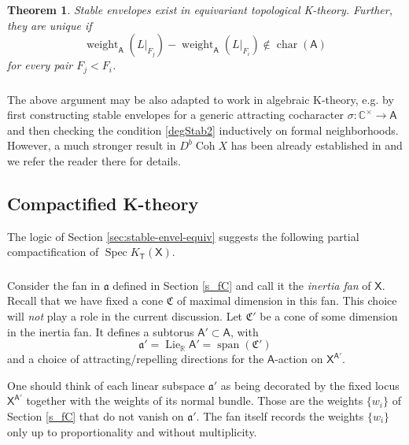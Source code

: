 \documentclass[14pt]{extarticle}
\newcommand{\Ct}{\mathbb{C}^\times}
\newcommand{\R}{\mathbb{R}}
\newcommand{\bT}{\mathsf{T}}
\newcommand{\bA}{\mathsf{A}}
\newcommand{\bX}{\mathsf{X}}
\newcommand{\fC}{\mathfrak{C}}
\newcommand{\fa}{\mathfrak{a}}
\DeclareMathOperator{\Coh}{Coh}
\DeclareMathOperator{\Lie}{Lie}
\DeclareMathOperator{\cha}{char}
\DeclareMathOperator{\Spec}{Spec}
\DeclareMathOperator{\Span}{span}
\DeclareMathOperator{\weight}{weight}
\newtheorem{Theorem}{Theorem}
\theoremstyle{definition}
\begin{document}
\begin{Theorem}
Stable envelopes exist in equivariant topological
K-theory. Further, they are 
unique if
$$
\weight_\bA\left(L\big|_{F_j}\right) - 
\weight_\bA\left(L\big|_{F_i}\right) \notin \cha(\bA)
$$
for every pair $F_j < F_i$. 
\end{Theorem}

\subsubsection{}
The above argument may be also adapted to work in algebraic K-theory,
e.g. by first constructing stable envelopes for a generic attracting
cocharacter $\sigma: \Ct \to \bA$ and then checking the condition
\eqref{degStab2}
inductively on formal neighborhoods. However, a much stronger result
in $D^b \Coh X$ has been already established in \cite{DHLMO} and we refer
the reader there for details.

\subsection{Compactified K-theory}

The logic of Section \ref{sec:stable-envel-equiv} suggests the
following partial compactification of $\Spec K_\bT(\bX)$.

\subsubsection{}\label{s_intertia_fan}



Consider the fan in $\fa$ defined in Section \ref{s_fC} and call it
the \emph{inertia fan} of $\bX$. Recall that we have fixed a cone
$\fC$ of maximal dimension in this fan. This choice will \emph{not} play a role
in the current discussion. Let $\fC'$ be a cone of some dimension in
the inertia fan. It defines a subtorus $\bA' \subset \bA$, with
$$
\fa' =\Lie_\R \bA' = \Span(\fC')
$$
and a choice of attracting/repelling directions for the $\bA$-action
on $\bX^{\bA'}$.


One should think of each linear subspace $\fa'$ as being
decorated by the fixed locus $\bX^{\bA'}$ together with the weights of
its normal bundle. Those are the weights $\{w_i\}$ of Section
\ref{s_fC} that do not vanish on $\fa'$. The fan itself records the 
weights $\{w_i\}$ only up to proportionality and without multiplicity. 

\subsubsection{}
\end{document}

